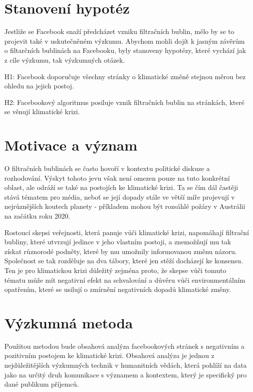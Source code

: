 \section{Stanovení hypotéz}
\label{sec:stanoveni-hypotez}
    Jestliže se Facebook snaží předcházet vzniku filtračních bublin, mělo by se to projevit také v uskutečněném výzkumu. Abychom mohli dojít k jasným závěrům o filtarčních bublinách na Facebooku, byly stanoveny hypotézy, které vychází jak z cíle výzkumu, tak výzkumných otázek. 
    
    \setlength\parskip{5mm}
    
    H1: Facebook doporučuje všechny stránky o klimatické změně stejnou měrou bez ohledu na jejich postoj.
    
    \setlength\parskip{0mm}{}
    
    H2: Facebookový algoritmus posiluje vznik filtračních bublin na stránkách, které se věnují klimatické krizi.

\section{Motivace a význam}
\label{sec:motivace-vyznam}
    O filtračních bublinách se často hovoří v kontextu politické diskuze a rozhodování. Výskyt tohoto jevu však není omezen pouze na tuto konkrétní oblast, ale odráží se také na postojích ke klimatické krizi. 
    Ta se čím dál častěji stává tématem pro média, neboť se její dopady stále ve větší míře projevují v nejrůznějších koutech planety - příkladem mohou být rozsáhlé požáry v Austrálii na začátku roku 2020.~\cite{tarabay10}
    
    Rostoucí skepsi veřejnosti, která panuje vůči klimatické krizi, napomáhají filtrační bubliny, které utvrzují jedince v jeho vlastním postoji, a znemožňují mu tak získat různorodé podněty, které by mu umožnily informovanou změnu názoru.~\cite{carmichael} Společnost se tak rozděluje na dva tábory, které jen stěží docházejí ke konsensu.~\cite{WILLIAMS2015126} Ten je pro klimatickou krizi důležitý zejména proto, že skepse vůči tomuto tématu může mít negativní efekt na schvalování a důvěru vůči environmentálním opatřením, které se usilují o zmírnění negativních dopadů klimatické změny.~\citep{AKLIN2014173}
    
    \section{Výzkumná metoda}
    Použitou metodou bude obsahová analýza facebookových stránek s negativním a pozitivním postojem ke klimatické krizi. Obsahová analýza je jednou z nejdůležitějších výzkumných technik v humanitních vědách, která pohlíží na data jako na určitý druh komunikace s významem a kontextem, který je specifický pro dané publikum příjemců.~\cite{krippendorff2018content}
    
